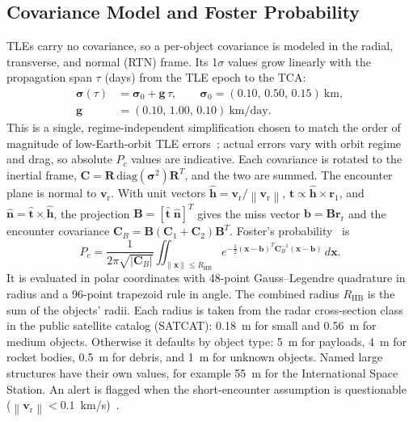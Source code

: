 \documentclass[conference]{IEEEtran}
\newcommand{\Pc}{P_c}
\newcommand{\bvec}[1]{\mathbf{#1}}
\newcommand{\norm}[1]{\left\|#1\right\|}
\newcommand{\HBR}{R_{\mathrm{HB}}}
\newcommand{\rr}{\bvec{r}_{\mathrm{r}}}
\newcommand{\vr}{\bvec{v}_{\mathrm{r}}}
\begin{document}
\subsection{Covariance Model and Foster Probability}

TLEs carry no covariance, so a per-object covariance is modeled in the
radial, transverse, and normal (RTN) frame. Its 1$\sigma$ values grow linearly
with the propagation span $\tau$ (days) from the TLE epoch to the TCA:
\begin{equation}
\begin{aligned}
  \boldsymbol{\sigma}(\tau) &= \boldsymbol{\sigma}_0 + \bvec{g}\,\tau,\qquad
  \boldsymbol{\sigma}_0=(0.10,\,0.50,\,0.15)~\text{km},\\
  \bvec{g} &= (0.10,\,1.00,\,0.10)~\text{km/day}.
\end{aligned}
\label{eq:cov}
\end{equation}
This is a single, regime-independent simplification chosen to match the order
of magnitude of low-Earth-orbit TLE errors~\cite{flohrer2008,vallado2012};
actual errors vary with orbit regime and drag, so absolute $\Pc$ values are
indicative. Each covariance is rotated to the inertial frame,
$\bvec{C}=\bvec{R}\,\mathrm{diag}(\boldsymbol{\sigma}^2)\bvec{R}^{T}$, and the
two are summed. The encounter plane is normal to $\vr$. With unit vectors
$\hat{\bvec{h}}=\vr/\norm{\vr}$,
$\hat{\bvec{t}}\propto\hat{\bvec{h}}\times\bvec{r}_1$, and
$\hat{\bvec{n}}=\hat{\bvec{t}}\times\hat{\bvec{h}}$, the projection
$\bvec{B}=[\hat{\bvec{t}}\;\hat{\bvec{n}}]^{T}$ gives the miss vector
$\bvec{b}=\bvec{B}\rr$ and the encounter covariance
$\bvec{C}_B=\bvec{B}(\bvec{C}_1+\bvec{C}_2)\bvec{B}^{T}$. Foster's
probability~\cite{foster1992} is
\begin{equation}
  \Pc=\frac{1}{2\pi\sqrt{|\bvec{C}_B|}}\iint_{\norm{\bvec{x}}\le\HBR}
  e^{-\frac{1}{2}(\bvec{x}-\bvec{b})^{T}\bvec{C}_B^{-1}(\bvec{x}-\bvec{b})}
  \,d\bvec{x}.
\label{eq:foster}
\end{equation}
It is evaluated in polar coordinates with 48-point Gauss--Legendre quadrature
in radius and a 96-point trapezoid rule in angle. The combined radius $\HBR$ is
the sum of the objects' radii. Each radius is taken from the radar
cross-section class in the public satellite catalog (SATCAT): 0.18~m for small
and 0.56~m for medium objects. Otherwise it defaults by object type: 5~m for
payloads, 4~m for rocket bodies, 0.5~m for debris, and 1~m for unknown objects.
Named large structures have their own values, for example 55~m for the
International Space Station. An alert is flagged when the short-encounter
assumption is questionable
($\norm{\vr}<0.1$~km/s)~\cite{akella2000,hall2019}.
\end{document}
